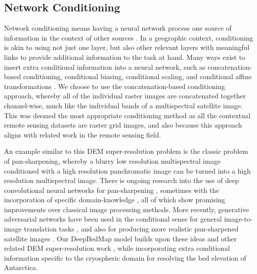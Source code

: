 \documentclass[tc, manuscript]{copernicus}
\begin{document}
\subsection{Network Conditioning} \label{section:networkconditioning}

Network conditioning means having a neural network process one source of information in the context of other sources \citep{DumoulinFeaturewisetransformations2018}.
In a geographic context, conditioning is akin to using not just one layer, but also other relevant layers with meaningful links to provide additional information to the task at hand.
Many ways exist to insert extra conditional information into a neural network, such as concatenation-based conditioning, conditional biasing, conditional scaling, and conditional affine transformations \citep{DumoulinFeaturewisetransformations2018}.
We choose to use the concatenation-based conditioning approach, whereby all of the individual raster images are concatenated together channel-wise, much like the individual bands of a multispectral satellite image.
This was deemed the most appropriate conditioning method as all the contextual remote sensing datasets are raster grid images, and also because this approach aligns with related work in the remote sensing field.

An example similar to this DEM super-resolution problem is the classic problem of pan-sharpening, whereby a blurry low resolution multispectral image conditioned with a high resolution panchromatic image can be turned into a high resolution multispectral image.
There is ongoing research into the use of deep convolutional neural networks for pan-sharpening \citep{MasiPansharpeningConvolutionalNeural2016,ScarpaTargetAdaptiveCNNBasedPansharpening2018}, sometimes with the incorporation of specific domain-knowledge \citep{YangPanNetDeepNetwork2017}, all of which show promising improvements over classical image processing methods.
More recently, generative adversarial networks \citep{GoodfellowGenerativeAdversarialNetworks2014} have been used in the conditional sense for general image-to-image translation tasks \citep[e.g.][]{IsolaImagetoImageTranslationConditional2016,ParkSemanticImageSynthesis2019}, and also for producing more realistic pan-sharpened satellite images \citep{LiuPSGANGenerativeAdversarial2018}.
Our DeepBedMap model builds upon these ideas and other related DEM super-resolution work \citep{XuNonlocalsimilaritybased2015,ChenConvolutionalNeuralNetwork2016}, while incorporating extra conditional information specific to the cryospheric domain for resolving the bed elevation of Antarctica.
\end{document}
